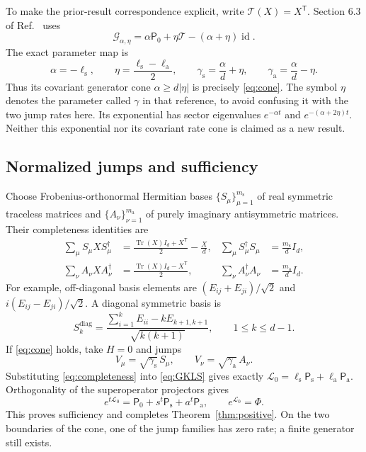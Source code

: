 \documentclass[11pt]{article}
\newcommand{\id}{\operatorname{id}}
\newcommand{\tr}{\operatorname{Tr}}
\newcommand{\Ps}{\mathsf{P}_{\mathrm{s}}}
\newcommand{\Pa}{\mathsf{P}_{\mathrm{a}}}
\newcommand{\Pz}{\mathsf{P}_{0}}
\newcommand{\gs}{\gamma_{\mathrm{s}}}
\newcommand{\ga}{\gamma_{\mathrm{a}}}
\begin{document}
To make the prior-result correspondence explicit, write
$\mathcal T(X)=X^{\mathsf T}$. Section 6.3 of Ref.~\cite{Bhat2023} uses
\begin{equation}
 \mathcal G_{\alpha,\eta}
  =\alpha\Pz+\eta\mathcal T-(\alpha+\eta)\id.
 \label{eq:prior}
\end{equation}
The exact parameter map is
\begin{equation}
 \alpha=-\ell_{\mathrm{s}},\qquad
 \eta=\frac{\ell_{\mathrm{s}}-\ell_{\mathrm{a}}}{2},\qquad
 \gs=\frac{\alpha}{d}+\eta,\qquad
 \ga=\frac{\alpha}{d}-\eta.                        \label{eq:map}
\end{equation}
Thus its covariant generator cone $\alpha\geq d|\eta|$ is precisely
\eqref{eq:cone}. The symbol $\eta$ denotes the parameter called $\gamma$
in that reference, to avoid confusing it with the two jump rates here.
Its exponential has sector eigenvalues
$e^{-\alpha t}$ and $e^{-(\alpha+2\eta)t}$.
Neither this exponential nor its covariant rate cone is claimed as a new
result.

\subsection{Normalized jumps and sufficiency}

Choose Frobenius-orthonormal Hermitian bases
$\{S_\mu\}_{\mu=1}^{m_{\mathrm{s}}}$ of real symmetric traceless matrices
and $\{A_\nu\}_{\nu=1}^{m_{\mathrm{a}}}$ of purely imaginary
antisymmetric matrices. Their completeness identities are
\begin{align}
 \sum_\mu S_\mu XS_\mu^\dagger
 &=\frac{\tr(X)I_d+X^{\mathsf T}}2-\frac Xd,
 &\sum_\mu S_\mu^\dagger S_\mu&=\frac{m_{\mathrm{s}}}{d}I_d,\nonumber\\
 \sum_\nu A_\nu XA_\nu^\dagger
 &=\frac{\tr(X)I_d-X^{\mathsf T}}2,
 &\sum_\nu A_\nu^\dagger A_\nu&=\frac{m_{\mathrm{a}}}{d}I_d.
                                                            \label{eq:completeness}
\end{align}
For example, off-diagonal basis elements are
$(E_{ij}+E_{ji})/\sqrt2$ and $i(E_{ij}-E_{ji})/\sqrt2$.
A diagonal symmetric basis is
\begin{equation}
 S^{\mathrm{diag}}_k=
 \frac{\sum_{i=1}^k E_{ii}-kE_{k+1,k+1}}{\sqrt{k(k+1)}},
 \qquad 1\leq k\leq d-1.
\end{equation}
If \eqref{eq:cone} holds, take $H=0$ and jumps
\begin{equation}
       V_\mu=\sqrt{\gs}\,S_\mu,\qquad
       V_\nu=\sqrt{\ga}\,A_\nu.                   \label{eq:jumps}
\end{equation}
Substituting \eqref{eq:completeness} into \eqref{eq:GKLS} gives exactly
$\mathcal L_0=\ell_{\mathrm{s}}\Ps+\ell_{\mathrm{a}}\Pa$.
Orthogonality of the superoperator projectors gives
\begin{equation}
 e^{t\mathcal L_0}
  =\Pz+s^t\Ps+a^t\Pa, \qquad
 e^{\mathcal L_0}=\Phi.                           \label{eq:exp}
\end{equation}
This proves sufficiency and completes Theorem~\ref{thm:positive}.
On the two boundaries of the cone, one of the jump families has zero
rate; a finite generator still exists.
\end{document}
